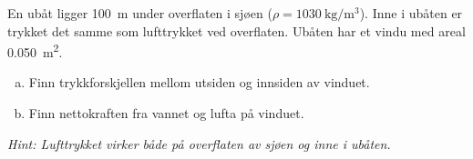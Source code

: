 %
En ubåt ligger \SI{100}{\metre} under overflaten i sjøen ($\rho = \SI{1030}{\kilo\gram\per\metre\cubed}$). Inne i ubåten er trykket det samme som lufttrykket ved overflaten. Ubåten har et vindu med areal \SI{0.050}{\metre\squared}.
\begin{enumerate}[a)]
    \item Finn trykkforskjellen mellom utsiden og innsiden av vinduet.
    \item Finn nettokraften fra vannet og lufta på vinduet.
\end{enumerate}
\textit{Hint: Lufttrykket virker både på overflaten av sjøen og inne i ubåten.}
%
